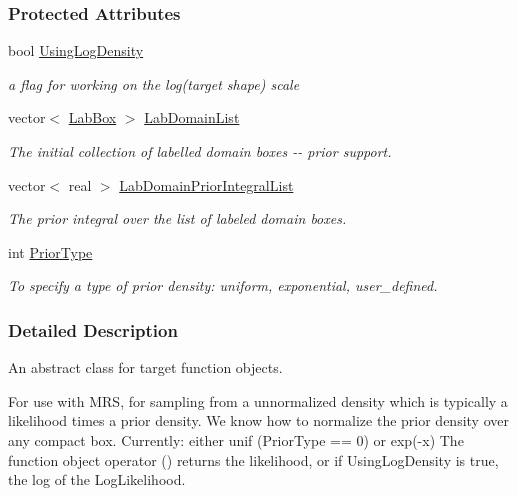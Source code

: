 \subsubsection*{\-Protected \-Attributes}
\begin{DoxyCompactItemize}
\item 
bool \hyperlink{classFobj_acf1d6b659549cea75e54582668ea7c3b}{\-Using\-Log\-Density}
\begin{DoxyCompactList}\small\item\em a flag for working on the log(target shape) scale \end{DoxyCompactList}\item 
vector$<$ \hyperlink{classLabBox}{\-Lab\-Box} $>$ \hyperlink{classFobj_a7d5297f74590a7bf95aa65d37a72fdff}{\-Lab\-Domain\-List}
\begin{DoxyCompactList}\small\item\em \-The initial collection of labelled domain boxes -\/-\/ prior support. \end{DoxyCompactList}\item 
vector$<$ real $>$ \hyperlink{classFobj_aacc4fb1fe699ad34bd51eea955220d72}{\-Lab\-Domain\-Prior\-Integral\-List}
\begin{DoxyCompactList}\small\item\em \-The prior integral over the list of labeled domain boxes. \end{DoxyCompactList}\item 
int \hyperlink{classFobj_aa58fc4a0d73e6ece446db9a87a633820}{\-Prior\-Type}
\begin{DoxyCompactList}\small\item\em \-To specify a type of prior density\-: uniform, exponential, user\-\_\-defined. \end{DoxyCompactList}\end{DoxyCompactItemize}


\subsubsection{\-Detailed \-Description}
\-An abstract class for target function objects. 

\-For use with \-M\-R\-S, for sampling from a unnormalized density which is typically a likelihood times a prior density. \-We know how to normalize the prior density over any compact box. \-Currently\-: either unif (\-Prior\-Type == 0) or exp(-\/x) \-The function object operator () returns the likelihood, or if \-Using\-Log\-Density is true, the log of the \-Log\-Likelihood.

